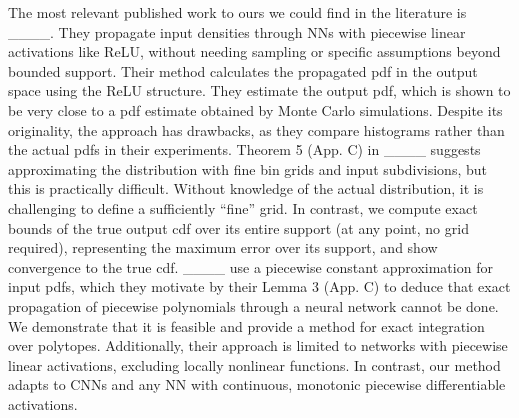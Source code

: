 The most relevant published work to ours we could find in the literature is ____. They propagate input densities through NNs with piecewise linear activations like ReLU, without needing sampling or specific assumptions beyond bounded support. Their method calculates the propagated pdf in the output space using the ReLU structure. They estimate the output pdf, which is shown to be very close to a pdf estimate obtained by Monte Carlo simulations. Despite its originality, the approach has drawbacks, as they compare histograms rather than the actual pdfs in their experiments. Theorem 5 (App. C) in ____ suggests approximating the distribution with fine bin grids and input subdivisions, but this is practically difficult. Without knowledge of the actual distribution, it is challenging to define a sufficiently ``fine'' grid. In contrast, we compute exact bounds of the true output cdf over its entire support (at any point, no grid required), representing the maximum error over its support, and show %
convergence to the true cdf. %
____ use a piecewise constant approximation for input pdfs, which they motivate by their Lemma 3 (App. C) to deduce that exact propagation of piecewise polynomials through a neural network cannot be done. 
We demonstrate that it is feasible and provide a method for exact integration over polytopes. Additionally, their approach is limited to networks with piecewise linear activations, excluding locally nonlinear functions. In contrast, our method adapts to CNNs and any NN with continuous, monotonic piecewise differentiable activations.